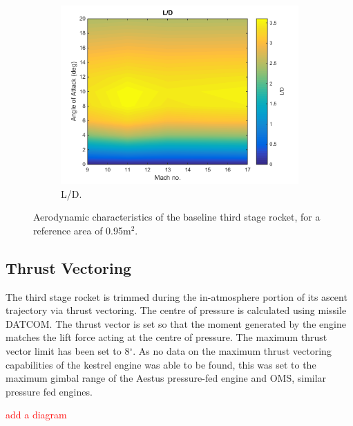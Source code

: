 \begin{figure}
\begin{subfigure}{.5\textwidth}
				\includegraphics[width=0.99\linewidth]{figures/3_vehicle_design/ThirdStageLD}
				\caption{L/D.}
				\label{fig:LD-ThirdStage}
			\end{subfigure}
			\caption{Aerodynamic characteristics of the baseline third stage rocket, for a reference area of 0.95m$^2$.}
			\label{fig:ThirdStageAero}
		\end{figure}
		
		
		
		\subsection{Thrust Vectoring}
		
		The third stage rocket is trimmed during the in-atmosphere portion of its ascent trajectory via thrust vectoring. The centre of pressure is calculated using missile DATCOM. The thrust vector is set so that the moment generated by the engine matches the lift force acting at the centre of pressure. The maximum thrust vector limit has been set to 8$^\circ$. As no data on the maximum thrust vectoring capabilities of the kestrel engine was able to be found, this was set to the maximum gimbal range of the Aestus pressure-fed engine and OMS, similar pressure fed engines. 
		
		\textcolor{red}{add a diagram}
		

		